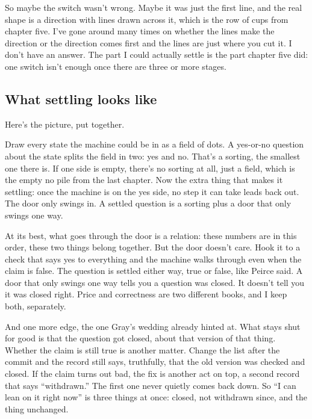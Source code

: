 \documentclass[11pt,twoside]{article}
\theoremstyle{thielethm}
\theoremstyle{thieledef}
\theoremstyle{thieledef}
\theoremstyle{thieledef}
\theoremstyle{thielethm}
\theoremstyle{thieleobs}
\theoremstyle{thielethm}
\begin{document}
So maybe the switch wasn't wrong. Maybe it was just the first line, and the real shape is a direction with lines drawn across it, which is the row of cups from chapter five. I've gone around many times on whether the lines make the direction or the direction comes first and the lines are just where you cut it. I don't have an answer. The part I could actually settle is the part chapter five did: one switch isn't enough once there are three or more stages.

\subsection{What settling looks like}

Here's the picture, put together.

Draw every state the machine could be in as a field of dots. A yes-or-no question about the state splits the field in two: yes and no. That's a sorting, the smallest one there is. If one side is empty, there's no sorting at all, just a field, which is the empty no pile from the last chapter. Now the extra thing that makes it settling: once the machine is on the yes side, no step it can take leads back out. The door only swings in. A settled question is a sorting plus a door that only swings one way.

At its best, what goes through the door is a relation: these numbers are in this order, these two things belong together. But the door doesn't care. Hook it to a check that says yes to everything and the machine walks through even when the claim is false. The question is settled either way, true or false, like Peirce said. A door that only swings one way tells you a question was closed. It doesn't tell you it was closed right. Price and correctness are two different books, and I keep both, separately.

And one more edge, the one Gray's wedding already hinted at. What stays shut for good is that the question got closed, about that version of that thing. Whether the claim is still true is another matter. Change the list after the commit and the record still says, truthfully, that the old version was checked and closed. If the claim turns out bad, the fix is another act on top, a second record that says ``withdrawn.'' The first one never quietly comes back down. So ``I can lean on it right now'' is three things at once: closed, not withdrawn since, and the thing unchanged.

\end{document}
